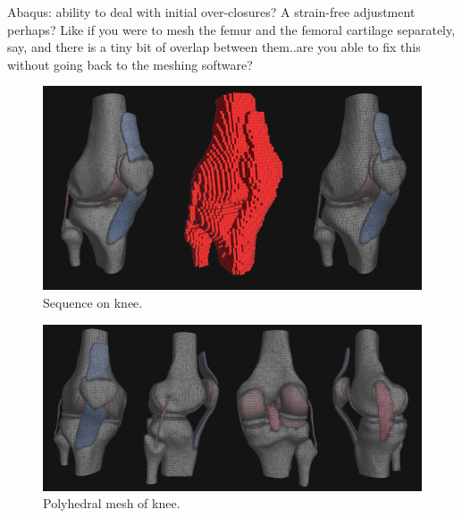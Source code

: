 Abaqus: ability to deal with initial over-closures? A strain-free adjustment perhaps? Like if you were to mesh the femur and the femoral cartilage separately, say, and there is a tiny bit of overlap between them..are you able to fix this without going back to the meshing software?  

\begin{figure}[tbh]
\centering
\includegraphics{media/sequence.png}
\caption[sequence]{Sequence on knee.}
\label{fig.sequence}
\end{figure}

\begin{figure}[tbh]
\centering
\includegraphics{media/fullmesh.png}
\caption[polyhedral knee]{Polyhedral mesh of knee.}
\label{fig.sample_1}
\end{figure}